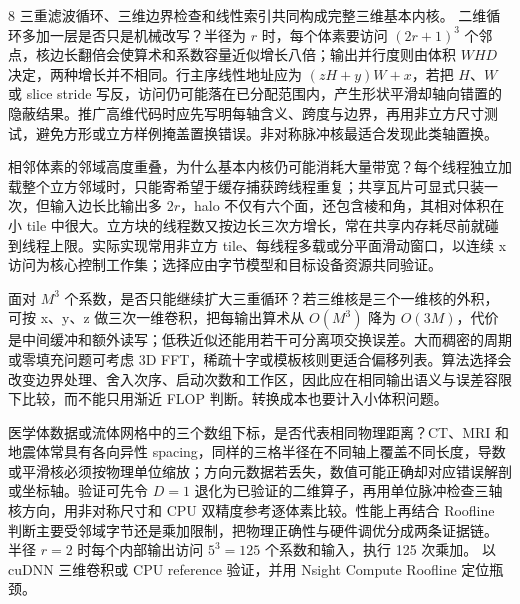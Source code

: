 \begin{solutionexercise}{8}
\conclusionheading 三重滤波循环、三维边界检查和线性索引共同构成完整三维基本内核。
\discussionheading
{}
二维循环多加一层是否只是机械改写？半径为 $r$ 时，每个体素要访问 $(2r+1)^3$ 个邻点，核边长翻倍会使算术和系数容量近似增长八倍；输出并行度则由体积 $WHD$ 决定，两种增长并不相同。行主序线性地址应为 $(zH+y)W+x$，若把 $H$、$W$ 或 slice stride 写反，访问仍可能落在已分配范围内，产生形状平滑却轴向错置的隐蔽结果。推广高维代码时应先写明每轴含义、跨度与边界，再用非立方尺寸测试，避免方形或立方样例掩盖置换错误。非对称脉冲核最适合发现此类轴置换。

相邻体素的邻域高度重叠，为什么基本内核仍可能消耗大量带宽？每个线程独立加载整个立方邻域时，只能寄希望于缓存捕获跨线程重复；共享瓦片可显式只装一次，但输入边长比输出多 $2r$，halo 不仅有六个面，还包含棱和角，其相对体积在小 tile 中很大。立方块的线程数又按边长三次方增长，常在共享内存耗尽前就碰到线程上限。实际实现常用非立方 tile、每线程多载或分平面滑动窗口，以连续 x 访问为核心控制工作集；选择应由字节模型和目标设备资源共同验证。

面对 $M^3$ 个系数，是否只能继续扩大三重循环？若三维核是三个一维核的外积，可按 x、y、z 做三次一维卷积，把每输出算术从 $O(M^3)$ 降为 $O(3M)$，代价是中间缓冲和额外读写；低秩近似还能用若干可分离项交换误差。大而稠密的周期或零填充问题可考虑 3D FFT，稀疏十字或模板核则更适合偏移列表。算法选择会改变边界处理、舍入次序、启动次数和工作区，因此应在相同输出语义与误差容限下比较，而不能只用渐近 FLOP 判断。转换成本也要计入小体积问题。

医学体数据或流体网格中的三个数组下标，是否代表相同物理距离？CT、MRI 和地震体常具有各向异性 spacing，同样的三格半径在不同轴上覆盖不同长度，导数或平滑核必须按物理单位缩放；方向元数据若丢失，数值可能正确却对应错误解剖或坐标轴。验证可先令 $D=1$ 退化为已验证的二维算子，再用单位脉冲检查三轴核方向，用非对称尺寸和 CPU 双精度参考逐体素比较。性能上再结合 Roofline 判断主要受邻域字节还是乘加限制，把物理正确性与硬件调优分成两条证据链。
\variantheading 半径 $r=2$ 时每个内部输出访问 $5^3=125$ 个系数和输入，执行 125 次乘加。
\practiceheading 以 cuDNN 三维卷积或 CPU reference 验证，并用 Nsight Compute Roofline 定位瓶颈。
\end{solutionexercise}

